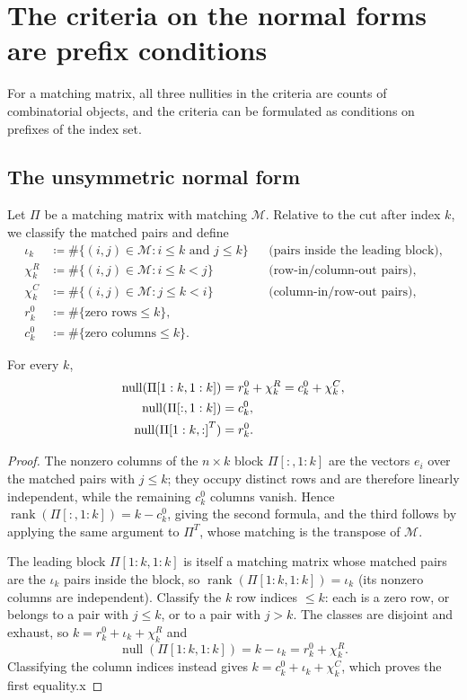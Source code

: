 \documentclass[preprint,12pt]{elsarticle}
\theoremstyle{plain}
\theoremstyle{nonumberplain}
\newtheorem{proof}{Proof}
\numberwithin{equation}{section}
\DeclareMathOperator{\rk}{rank}
\DeclareMathOperator{\nl}{null}
\newcommand{\by}{\times}
\newcommand{\M}{\mathcal{M}}
\numberwithin{theorem}{section}
\begin{document}
\section{The criteria on the normal forms are prefix conditions}\label{sec:combinatorics}

For a matching matrix, all three nullities in the criteria are counts of combinatorial objects, and the criteria can be formulated as conditions on prefixes of the index set.

\subsection{The unsymmetric normal form}

Let $\Pi$ be a matching matrix with matching $\M$.  Relative to the cut
after index $k$, we classify the matched pairs and define
\begin{align*}
  \iota_k &\coloneq \#\{(i,j) \in \M \colon i \le k \text{ and } j \le k\}
  && \text{(pairs inside the leading block)},\\
  \chi^R_k &\coloneq \#\{(i,j) \in \M \colon i \le k < j\}
  && \text{(row-in/column-out pairs)},\\
  \chi^C_k &\coloneq \#\{(i,j) \in \M \colon j \le k < i\}
  && \text{(column-in/row-out pairs)},\\
  r^0_k &\coloneq \#\{\text{zero rows} \le k\},\\
  c^0_k &\coloneq \#\{\text{zero columns} \le k\}.
\end{align*}

\begin{lemma}\label{lem:null-matching}
  For every $k$,
  \begin{align}\label{eq:null-matching}
    \nl(\Pi[1:k,1:k]) &= r^0_k + \chi^R_k = c^0_k + \chi^C_k,\\
    \nl(\Pi[:,1:k]) &= c^0_k,\notag\\
    \nl({\Pi[1:k,:]}^T) &= r^0_k .\notag
  \end{align}
\end{lemma}

\begin{proof}
  The nonzero columns of the $n \by k$ block $\Pi[:,1:k]$ are the vectors $e_i$ over the matched pairs with $j \le k$; they occupy distinct rows and are therefore linearly independent, while the remaining $c^0_k$ columns vanish.  Hence $\rk(\Pi[:,1:k]) = k - c^0_k$, giving the second formula, and the third follows by applying the same argument to $\Pi^T$, whose matching is the transpose of $\M$.

  The leading block $\Pi[1:k,1:k]$ is itself a matching matrix whose matched pairs are the $\iota_k$ pairs inside the block, so $\rk(\Pi[1:k,1:k]) = \iota_k$ (its nonzero columns are independent).  Classify the $k$ row indices $\le k$: each is a zero row, or belongs to a pair with $j \le k$, or to a pair with $j > k$. The classes are disjoint and exhaust, so $k = r^0_k + \iota_k + \chi^R_k$ and
  $$
  \nl(\Pi[1:k,1:k]) = k - \iota_k = r^0_k + \chi^R_k.
  $$
  Classifying the column indices instead gives $k = c^0_k + \iota_k + \chi^C_k$, which proves the first equality.x
\end{proof}
\end{document}
